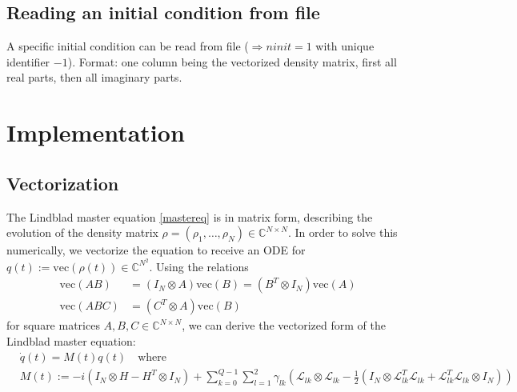 \documentclass[11pt]{article}
\newcommand{\Ell}{\mathcal{L}}
\newcommand{\C}{\mathds{C}}
\begin{document}
\subsection{Reading an initial condition from file}
A specific initial condition can be read from file ($\Rightarrow ninit=1$ with unique identifier $-1$). Format: one column being the vectorized density matrix, first all real parts, then all imaginary parts. 

\section{Implementation}

  \subsection{Vectorization}
  The Lindblad master equation \eqref{mastereq} is in matrix form, describing
  the evolution of the density matrix $\rho = (\rho_1, \dots, \rho_N) \in
  \C^{N\times N}$. In order to solve this numerically, we vectorize the equation
  to receive an ODE for $q(t) := \text{vec}(\rho(t)) \in \C^{N^2}$. Using the
  relations
  \begin{align}
   \text{vec}(AB) &= (I_N\otimes A)\text{vec}(B) = (B^T\otimes I_N)\text{vec}(A)
    \\
   \text{vec}(ABC) &= (C^T\otimes A)\text{vec}(B)
  \end{align}
  for square matrices $A,B,C\in\C^{N\times N}$, we can derive the vectorized
  form of the Lindblad master equation:
  \begin{align}\label{mastereq_vectorized}
    &\dot q(t) = M(t) q(t) \quad  \text{where} \\
    &M(t) := -i(I_N\otimes H - H^T \otimes I_N) + \sum_{k=0}^{Q-1}\sum_{l=1}^2 \gamma_{lk}
    \left( \Ell_{lk}\otimes \Ell_{lk} - \frac 1 2 \left( I_N\otimes
    \Ell^T_{lk}\Ell_{lk} + \Ell^T_{lk}\Ell_{lk} \otimes I_N \right) \right)
  \end{align}
\end{document}
